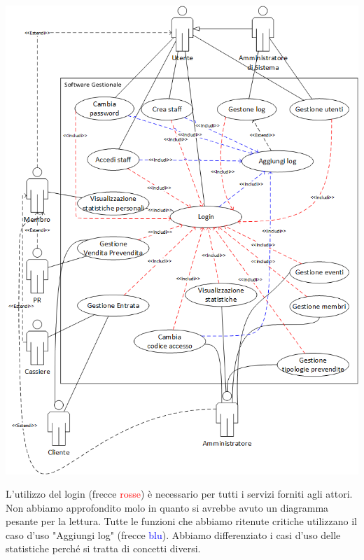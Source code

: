 \documentclass[a4paper]{article}
\begin{document}
\includegraphics[scale=0.9]{use_cases.png}

L'utilizzo del login (frecce \textcolor{red}{rosse}) è necessario per tutti i servizi forniti agli attori.
Non abbiamo approfondito molo in quanto si avrebbe avuto un diagramma pesante per la lettura.
Tutte le funzioni che abbiamo ritenute critiche utilizzano il caso d'uso "Aggiungi log" (frecce \textcolor{blue}{blu}).
Abbiamo differenziato i casi d'uso delle statistiche perché si tratta di concetti diversi.

\newpage
\end{document}
